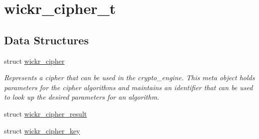 \hypertarget{group__wickr__cipher}{}\section{wickr\+\_\+cipher\+\_\+t}
\label{group__wickr__cipher}
\subsection*{Data Structures}
\begin{DoxyCompactItemize}
\item 
struct \hyperlink{structwickr__cipher}{wickr\+\_\+cipher}
\begin{DoxyCompactList}\small\item\em Represents a cipher that can be used in the crypto\+\_\+engine. This meta object holds parameters for the cipher algorithms and maintains an identifier that can be used to look up the desired parameters for an algorithm. \end{DoxyCompactList}\item 
struct \hyperlink{structwickr__cipher__result}{wickr\+\_\+cipher\+\_\+result}
\item 
struct \hyperlink{structwickr__cipher__key}{wickr\+\_\+cipher\+\_\+key}
\end{DoxyCompactItemize}
